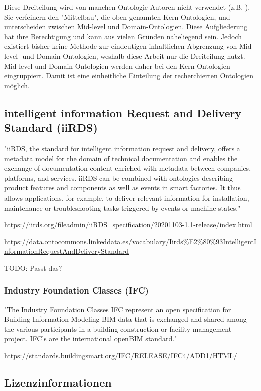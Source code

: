 \documentclass{article}
\begin{document}
Diese Dreiteilung wird von manchen Ontologie-Autoren nicht verwendet (z.B. \cite{kulvatunyou2022}).
Sie verfeinern den "Mittelbau", die oben genannten Kern-Ontologien, und unterscheiden zwischen Mid-level und Domain-Ontologien.
Diese Aufgliederung hat ihre Berechtigung und kann aus vielen Gründen naheliegend sein.
Jedoch existiert bisher keine Methode zur eindeutigen inhaltlichen Abgrenzung von Mid-level- und Domain-Ontologien, weshalb diese Arbeit nur die Dreiteilung nutzt.
Mid-level und Domain-Ontologien werden daher bei den Kern-Ontologien eingruppiert.
Damit ist eine einheitliche Einteilung der recherchierten Ontologien möglich.

\subsection{intelligent information Request and Delivery Standard (iiRDS)}

"iiRDS, the standard for intelligent information request and delivery, offers a metadata model for the domain of technical documentation and enables the exchange of documentation content enriched with metadata between companies, platforms, and services. iiRDS can be combined with ontologies describing product features and components as well as events in smart factories. It thus allows applications, for example, to deliver relevant information for installation, maintenance or troubleshooting tasks triggered by events or machine states."

https://iirds.org/fileadmin/iiRDS\_specification/20201103-1.1-release/index.html

\url{https://data.ontocommons.linkeddata.es/vocabulary/Iirds%E2%80%93IntelligentInformationRequestAndDeliveryStandard}

TODO: Passt das?

\subsubsection{Industry Foundation Classes (IFC)}

"The Industry Foundation Classes IFC represent an open specification for Building Information Modeling BIM data that is exchanged and shared among the various participants in a building construction or facility management project. IFC's are the international openBIM standard."

https://standards.buildingsmart.org/IFC/RELEASE/IFC4/ADD1/HTML/

\subsection{Lizenzinformationen}
\end{document}
